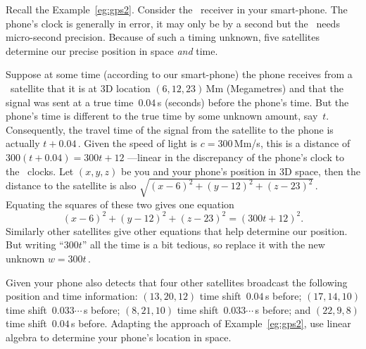 \begin{example} \label{eg:gps3t}
Recall the Example~\ref{eg:gps2}.
Consider the \gps\ receiver in your smart-phone.
The phone's clock is generally in error, it may only be by a second but the \gps\ needs micro-second precision. 
Because of such a timing unknown, five satellites determine our precise position in space \emph{and} time.

Suppose at some time (according to our smart-phone) the phone receives from a \gps\ satellite that it is at 3D location \((6,12,23)\)\,Mm (Megametres) and that the signal was sent at a true time~\(0.04\)\,s (seconds) before the phone's time.
But the phone's time is different to the true time by some unknown amount, say~\(t\).
Consequently, the travel time of the signal from the satellite to the phone is actually \(t+0.04\)\,.
Given the speed of light is \(c=300\)\,Mm/s, this is a distance of \(300(t+0.04)=300t+12\) ---linear in the discrepancy of the phone's clock to the \gps\ clocks.
Let \((x,y,z)\) be you and your phone's position in 3D space, then the distance to the satellite is also \(\sqrt{(x-6)^2+(y-12)^2+(z-23)^2}\)\,.
Equating the squares of these two gives one equation
\begin{equation*}
(x-6)^2+(y-12)^2+(z-23)^2=(300t+12)^2.
\end{equation*}
Similarly other satellites give other equations that help determine our position.
But writing ``\(300t\)'' all the time is a bit tedious, so replace it with the new unknown \(w=300t\)\,.

Given your phone also detects that four other satellites broadcast the following position and time information:
\((13,20,12)\) time shift~\(0.04\)\,s before;
\((17,14,10)\) time shift~\(0.033\cdots\)\,s before;
\((8,21,10)\) time shift~\(0.033\cdots\)\,s before; and
\((22,9,8)\) time shift~\(0.04\)\,s before.
Adapting the approach of Example~\ref{eg:gps2}, use linear algebra to determine your phone's location in space.


\end{example}
